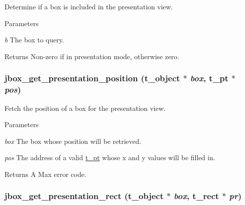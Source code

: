 Determine if a box is included in the presentation view. 
\begin{DoxyParams}{Parameters}
\item[{\em b}]The box to query. \end{DoxyParams}
\begin{DoxyReturn}{Returns}
Non-\/zero if in presentation mode, otherwise zero. 
\end{DoxyReturn}
\hypertarget{group__jbox_gae4db002ae3ff252be9e0fe1fce5aaffb}{
\subsubsection[{jbox\_\-get\_\-presentation\_\-position}]{ jbox\_\-get\_\-presentation\_\-position ({\bf t\_\-object} $\ast$ {\em box}, \/  {\bf t\_\-pt} $\ast$ {\em pos})}}
\label{group__jbox_gae4db002ae3ff252be9e0fe1fce5aaffb}


Fetch the position of a box for the presentation view. 
\begin{DoxyParams}{Parameters}
\item[{\em box}]The box whose position will be retrieved. \item[{\em pos}]The address of a valid \hyperlink{structt__pt}{t\_\-pt} whose x and y values will be filled in. \end{DoxyParams}
\begin{DoxyReturn}{Returns}
A Max error code. 
\end{DoxyReturn}
\hypertarget{group__jbox_ga987293837d1704cf7d461832e312c0b8}{
\subsubsection[{jbox\_\-get\_\-presentation\_\-rect}]{ jbox\_\-get\_\-presentation\_\-rect ({\bf t\_\-object} $\ast$ {\em box}, \/  {\bf t\_\-rect} $\ast$ {\em pr})}}
\label{group__jbox_ga987293837d1704cf7d461832e312c0b8}


